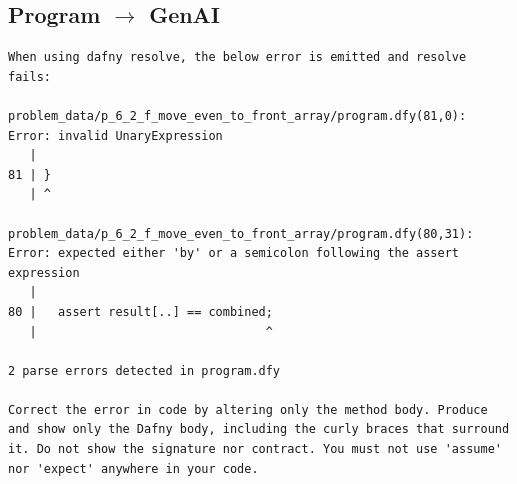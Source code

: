 \documentclass{article}
\begin{document}
\subsection*{Program $\rightarrow$ GenAI}
\begin{lstlisting}
When using dafny resolve, the below error is emitted and resolve fails:

problem_data/p_6_2_f_move_even_to_front_array/program.dfy(81,0): Error: invalid UnaryExpression
   |
81 | }
   | ^

problem_data/p_6_2_f_move_even_to_front_array/program.dfy(80,31): Error: expected either 'by' or a semicolon following the assert expression
   |
80 |   assert result[..] == combined;
   |                                ^

2 parse errors detected in program.dfy

Correct the error in code by altering only the method body. Produce and show only the Dafny body, including the curly braces that surround it. Do not show the signature nor contract. You must not use 'assume' nor 'expect' anywhere in your code.
\end{lstlisting}
\end{document}
